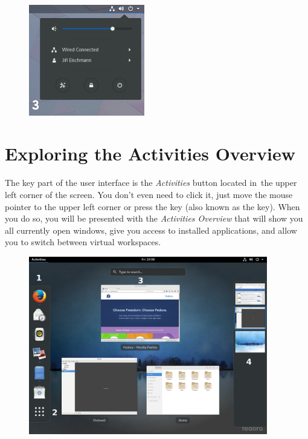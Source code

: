 \begin{enumerate}
\begin{figure}[tbp]
\begin{center}
\includegraphics[width=0.45\textwidth]{img/menu}
 \label{fig:menu}
\end{center}
\end{figure}

\end{enumerate}

\section*{Exploring the Activities Overview}

The key part of the user interface is the \emph{Activities} button located in~the upper left corner of the screen. You don't even need to click it, just move the mouse pointer to the upper left corner or press the  key (also known as the  key). When you do so, you will be presented with the \emph{Activities Overview} that will show you all currently open windows, give you access to installed applications, and allow you to switch between virtual workspaces.

\begin{figure}[t]
\begin{center}
\includegraphics[width=0.93\textwidth]{img/shell-b}
 \label{fig:shell-b}
\end{center}
\end{figure}

